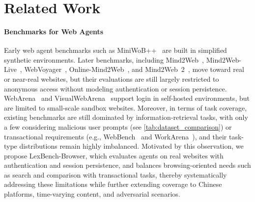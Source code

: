 \section{Related Work}
\paragraph{Benchmarks for Web Agents}
Early web agent benchmarks such as MiniWoB++~\citep{furuta2024multimodalwebnavigationinstructionfinetuned} are built in simplified synthetic environments. Later benchmarks, including Mind2Web~\citep{deng2023mind2web}, Mind2Web-Live~\citep{pan2024webcanvasbenchmarkingwebagents}, WebVoyager~\citep{he2024webvoyagerbuildingendtoendweb}, Online-Mind2Web~\citep{online-mind2web}, and Mind2Web~2~\citep{gou2025mind2web2evaluatingagentic}, move toward real or near-real websites, but their evaluations are still largely restricted to anonymous access without modeling authentication or session persistence. WebArena~\citep{zhou2023webarena} and VisualWebArena~\citep{koh2024visualwebarenaevaluatingmultimodalagents} support login in self-hosted environments, but are limited to small-scale sandbox websites. Moreover, in terms of task coverage, existing benchmarks are still dominated by information-retrieval tasks, with only a few considering malicious user prompts (see \cref{tab:dataset_comparison}) or transactional requirements (e.g., WebBench~\cite{webbench2025} and WorkArena~\cite{drouin2024workarenacapablewebagents}), and their task-type distributions remain highly imbalanced. Motivated by this observation, we propose LexBench-Browser, which evaluates agents on real websites with authentication and session persistence, and balances browsing-oriented needs such as search and comparison with transactional tasks, thereby systematically addressing these limitations while further extending coverage to Chinese platforms, time-varying content, and adversarial scenarios.




